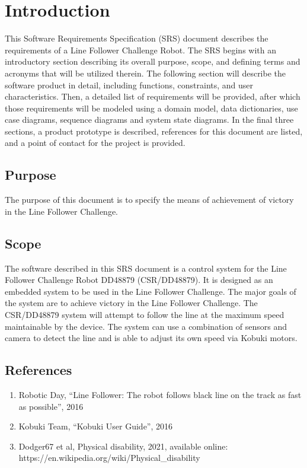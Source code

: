 \chapter{Introduction}
\label{ch:intro}

This Software Requirements Specification (SRS) document describes the requirements of a
Line Follower Challenge Robot. The SRS begins with an introductory section
describing its overall purpose, scope, and defining terms and acronyms that will be utilized
therein. The following section will describe the software product in detail, including functions,
constraints, and user characteristics. Then, a detailed list of requirements will be provided, after
which those requirements will be modeled using a domain model, data dictionaries, use case
diagrams, sequence diagrams and system state diagrams. In the final three sections, a product
prototype is described, references for this document are listed, and a point of contact for the
project is provided.

\section{Purpose}

The purpose of this document is to specify the means of achievement of victory in the Line Follower Challenge.

\section{Scope}

The software described in this SRS document is a control system for the Line Follower Challenge Robot DD48879 (CSR/DD48879). It is designed as an embedded system to be used in the Line Follower Challenge.
The major goals of the system are to achieve victory in the Line Follower Challenge.
The CSR/DD48879 system will attempt to follow the line at the maximum speed maintainable by the device. The system can use a combination of sensors and camera to detect the line and is able to adjust its own speed via Kobuki motors.

\section{References}

\begin{enumerate}
    \item \label{rules} Robotic Day, ``Line Follower: The robot follows black line on the track as fast as possible'', 2016
    \item \label{guide} Kobuki Team, ``Kobuki User Guide'', 2016
    \item \label{disability} Dodger67 et al, Physical disability, 2021, available online:\\ https://en.wikipedia.org/wiki/Physical\_disability
\end{enumerate}

